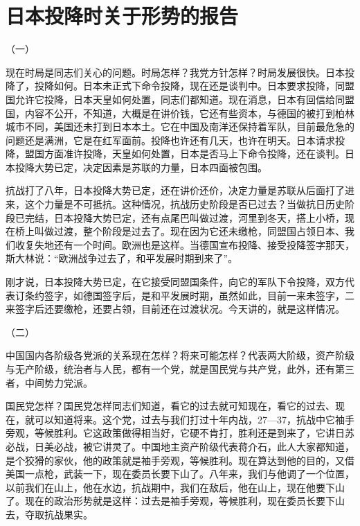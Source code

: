 \section[日本投降时关于形势的报告（一九四五年八月十三日）]{日本投降时关于形势的报告}


（一）

现在时局是同志们关心的问题。时局怎样？我党方针怎样？时局发展很快。日本投降了，投降如何。日本未正式下命令投降，现在还是谈判中。日本要求投降，同盟国允许它投降，日本天皇如何处置，同志们都知道。现在消息，日本有回信给同盟国，内容不公开，不知道，大概是在讲价钱，它还有些资本，与德国的被打到柏林城市不同，美国还未打到日本本土。它在中国及南洋还保持着军队，目前最危急的问题还是满洲，它是在红军面前。投降也许还有几天，也许在明天。日本请求投降，盟国方面准许投降，天皇如何处置，日本是否马上下命令投降，还在谈判。日本投降大势已定，决定因素是苏联的力量，日本四面被包围。

抗战打了八年，日本投降大势已定，还在讲价还价，决定力量是苏联从后面打了进来，这个力量是不可抵抗。这种情况，抗战历史阶段是否已过去？当做抗日历史阶段已完结，日本投降大势已定，还有点尾巴叫做过渡，河里到冬天，搭上小桥，现在桥上叫做过渡，整个阶段是过去了。现在因为它还未缴枪，同盟国占领日本、我们收复失地还有一个时间。欧洲也是这样。当德国宣布投降、接受投降签字那天，斯大林说：“欧洲战争过去了，和平发展时期到来了”。

刚才说，日本投降大势已定，在它接受同盟国条件，向它的军队下令投降，双方代表订条约签字，如德国签字后，是和平发展时期，虽然如此，目前一来未签字，二来签字后还要缴枪，还要占领，目前还在过渡状况。今天讲的，就是这样情况。

（二）

中国国内各阶级各党派的关系现在怎样？将来可能怎样？代表两大阶级，资产阶级与无产阶级，统治者与人民，都有一个党，就是国民党与共产党，此外，还有第三者，中间势力党派。

国民党怎样？国民党怎样同志们知道，看它的过去就可知现在，看它的过去、现在，就可以知道将来。这个党，过去与我们打过十年内战，27—37，抗战中它袖手旁观，等候胜利。它这政策做得相当好，它硬不肯打，胜利还是到来了，它讲日苏必战，日美必战，被它讲灵了。中国地主资产阶级代表蒋介石，此人大家都知道，是个狡猾的家伙，他的政策就是袖手旁观，等候胜利。现在算达到他的目的，又借美国一点枪，武装一下，现在委员长要下山了。八年来，我们与他调了一个位置，以前我们在山上，他在水边，抗战期中，我们在敌后，他在山上，现在他要下山了。现在的政治形势就是这样：过去是袖手旁观，等候胜利，现在委员长要下山去，夺取抗战果实。

